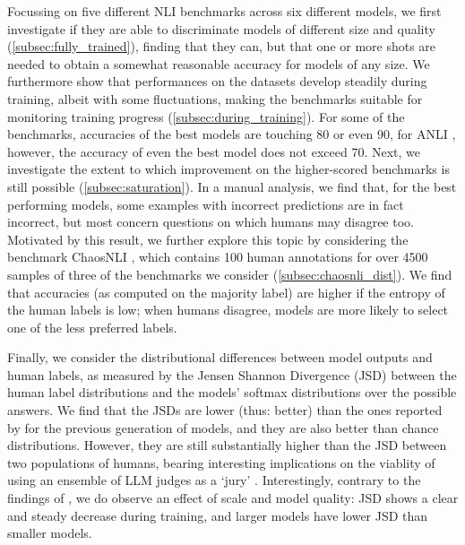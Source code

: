 Focussing on five different NLI benchmarks across six different models, we first investigate if they are able to discriminate models of different size and quality (\cref{subsec:fully_trained}), finding that they can, but that one or more shots are needed to obtain a somewhat reasonable accuracy for models of any size.
We furthermore show that performances on the datasets develop steadily during training, albeit with some fluctuations, making the benchmarks suitable for monitoring training progress (\cref{subsec:during_training}).
For some of the benchmarks, accuracies of the best models are touching 80 or even 90, for ANLI \citep{nie-etal-2020-adversarial}, however, the accuracy of even the best model does not exceed 70.
Next, we investigate the extent to which improvement on the higher-scored benchmarks is still possible (\cref{subsec:saturation}).
In a manual analysis, we find that, for the best performing models, some examples with incorrect predictions are in fact incorrect, but most concern questions on which humans may disagree too.
Motivated by this result, we further explore this topic by considering the benchmark ChaosNLI \citep{nie-etal-2020-learn}, which contains 100 human annotations for over 4500 samples of three of the benchmarks we consider (\cref{subsec:chaosnli_dist}).
We find that accuracies (as computed on the majority label) are higher if the entropy of the human labels is low; when humans disagree, models are more likely to select one of the less preferred labels.

Finally, we consider the distributional differences between model outputs and human labels, as measured by the Jensen Shannon Divergence (JSD) between the human label distributions and the models' softmax distributions over the possible answers.
We find that the JSDs are lower (thus: better) than the ones reported by \citet{nie-etal-2020-learn} for the previous generation of models, and they are also better than chance distributions. 
However, they are still substantially higher than the JSD between two populations of humans, bearing interesting implications on the viablity of using an ensemble of LLM judges as a `jury' \citep[e.g.][]{verga2024replacing}.
Interestingly, contrary to the findings of \citet{nie-etal-2020-learn}, we do observe an effect of scale and model quality: JSD shows a clear and steady decrease during training, and larger models have lower JSD than smaller models.

